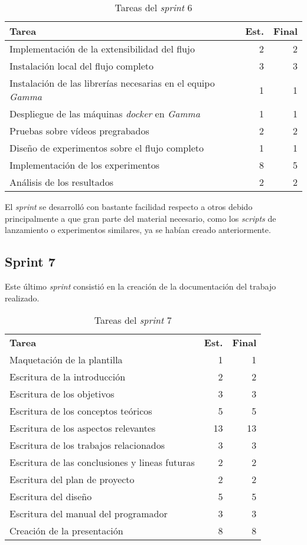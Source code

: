 \begin{table}[H]
	\begin{tabularx}{\linewidth}{X r r}
		\toprule \textbf{Tarea} & \textbf{Est.} & \textbf{Final}\\
		\toprule
		Implementación de la extensibilidad del flujo & 2 & 2\\
		Instalación local del flujo completo & 3 & 3\\
		Instalación de las librerías necesarias en el equipo \textit{Gamma} & 1 & 1\\
		Despliegue de las máquinas \textit{docker} en \textit{Gamma} & 1 & 1\\
		Pruebas sobre vídeos pregrabados & 2 & 2\\
		Diseño de experimentos sobre el flujo completo & 1 & 1\\
		Implementación de los experimentos & 8 & 5\\
		Análisis de los resultados & 2 & 2\\
		\bottomrule
	\end{tabularx}
	\caption{Tareas del \textit{sprint} 6}
	\label{tab:sprint6}
\end{table}

El \textit{sprint} se desarrolló con bastante facilidad respecto a otros debido principalmente a que gran parte del material necesario, como los \textit{scripts} de lanzamiento o experimentos similares, ya se habían creado anteriormente.

\subsection{Sprint 7}

Este último \textit{sprint} consistió en la creación de la documentación del trabajo realizado. 

\begin{table}[H]
	\begin{tabularx}{\linewidth}{X r r}
		\toprule \textbf{Tarea} & \textbf{Est.} & \textbf{Final}\\
		\otoprule
		Maquetación de la plantilla & 1 & 1\\
		Escritura de la introducción & 2 & 2\\
		Escritura de los objetivos & 3 & 3\\
		Escritura de los conceptos teóricos & 5 & 5\\
		Escritura de los aspectos relevantes & 13 & 13\\
		Escritura de los trabajos relacionados & 3 & 3\\
		Escritura de las conclusiones y lineas futuras & 2 & 2\\
		Escritura del plan de proyecto & 2 & 2\\
		Escritura del diseño & 5 & 5\\
		Escritura del manual del programador & 3 & 3\\
		Creación de la presentación & 8 & 8\\  
		\bottomrule
	\end{tabularx}
	\caption{Tareas del \textit{sprint} 7}
	\label{tab:sprint7}
\end{table}


